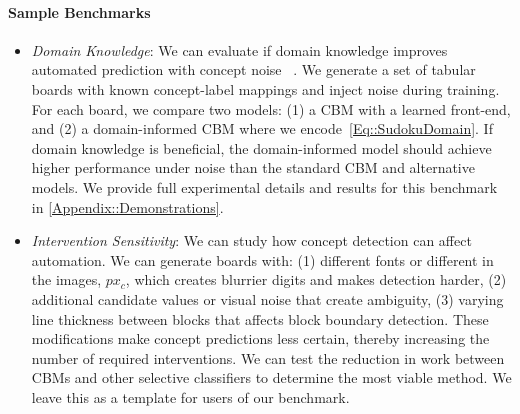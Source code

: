 \documentclass[11pt]{article}
\begin{document}
        


\paragraph{Sample Benchmarks}
\begin{itemize}[leftmargin=0pt,label={}]

\item \emph{Domain Knowledge}: We can evaluate if domain knowledge improves automated prediction with concept noise ~\citep{dash2022review, guo2023di}. We generate a set of tabular boards with known concept-label mappings and inject noise during training. For each board, we compare two models: (1) a CBM with a learned front-end, and (2) a domain-informed CBM where we encode~\cref{Eq::SudokuDomain}. If domain knowledge is beneficial, the domain-informed model should achieve higher performance under noise than the standard CBM and alternative models. We provide full experimental details and results for this benchmark in \cref{Appendix::Demonstrations}. 


\item \emph{Intervention Sensitivity}: We can study how concept detection can affect automation. We can generate boards with: (1) different fonts or different  in the images, $px_c$, which creates blurrier digits and makes detection harder, (2) additional candidate values or visual noise that create ambiguity, (3) varying line thickness between blocks that affects block boundary detection. These modifications make concept predictions less certain, thereby increasing the number of required interventions. We can test the reduction in work between CBMs and other selective classifiers to determine the most viable method. We leave this as a template for users of our benchmark.



\end{itemize}
\end{document}
